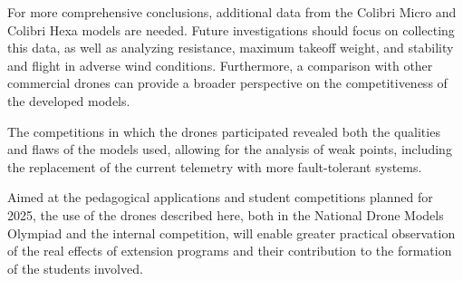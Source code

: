 \documentclass[conference]{IEEEtran}
\begin{document}
For more comprehensive conclusions, additional data from the Colibri Micro and Colibri Hexa models are needed. Future investigations should focus on collecting this data, as well as analyzing resistance, maximum takeoff weight, and stability and flight in adverse wind conditions. Furthermore, a comparison with other commercial drones can provide a broader perspective on the competitiveness of the developed models.

The competitions in which the drones participated revealed both the qualities and flaws of the models used, allowing for the analysis of weak points, including the replacement of the current telemetry with more fault-tolerant systems.

Aimed at the pedagogical applications and student competitions planned for 2025, the use of the drones described here, both in the National Drone Models Olympiad and the internal competition, will enable greater practical observation of the real effects of extension programs and their contribution to the formation of the students involved.
\end{document}
